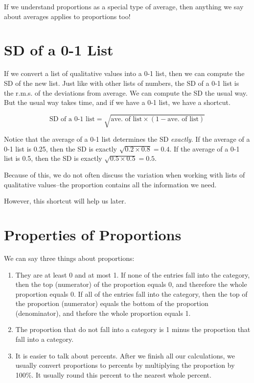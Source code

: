 \documentclass[]{book}
\providecommand{\tightlist}{%
  \setlength{\itemsep}{0pt}\setlength{\parskip}{0pt}}
\theoremstyle{definition}
\theoremstyle{definition}
\theoremstyle{definition}
\theoremstyle{remark}
\begin{document}
If we understand proportions as a special type of average, then anything
we say about averages applies to proportions too!

\section{SD of a 0-1 List}\label{sd-of-a-0-1-list}

If we convert a list of qualitative values into a 0-1 list, then we can
compute the SD of the new list. Just like with other lists of numbers,
the SD of a 0-1 list is the r.m.s. of the deviations from average. We
can compute the SD the usual way. But the usual way takes time, and if
we have a 0-1 list, we have a shortcut.

\[\text{SD of a 0-1 list} = \sqrt{\text{ave. of list} \times (1 - \text{ave. of list})}\]

Notice that the average of a 0-1 list determines the SD \emph{exactly}.
If the average of a 0-1 list is 0.25, then the SD is exactly
\(\sqrt{0.2 \times 0.8} = 0.4\). If the average of a 0-1 list is 0.5,
then the SD is exactly \(\sqrt{0.5 \times 0.5} = 0.5\).

Because of this, we do not often discuss the variation when working with
lists of qualitative values--the proportion contains all the information
we need.

However, this shortcut will help us later.

\section{Properties of Proportions}\label{properties-of-proportions}

We can say three things about proportions:

\begin{enumerate}
\def\labelenumi{\arabic{enumi}.}
\tightlist
\item
  They are at least 0 and at most 1. If none of the entries fall into
  the category, then the top (numerator) of the proportion equals 0, and
  therefore the whole proportion equals 0. If all of the entries fall
  into the category, then the top of the proportion (numerator) equals
  the bottom of the proportion (denominator), and thefore the whole
  proportion equals 1.
\item
  The proportion that do not fall into a category is 1 minus the
  proportion that fall into a category.
\item
  It is easier to talk about percents. After we finish all our
  calculations, we usually convert proportions to percents by
  multiplying the proportion by 100\%. It usually round this percent to
  the nearest whole percent.
\end{enumerate}
\end{document}

